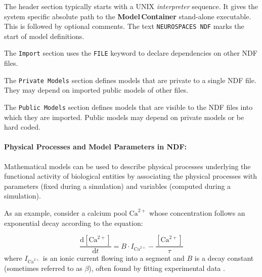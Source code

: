 \documentclass[11pt,3p,twocolumn]{JMN}
\begin{document}
The header section
typically starts with a UNIX {\it interpreter} sequence. It
gives the system specific absolute path to the {\bf Model\,Container} stand-alone executable.
This is followed by optional comments.  The text {\tt NEUROSPACES NDF} marks the start of model definitions.

The {\tt Import} section
 uses the {\tt FILE} keyword to declare
dependencies on other NDF files.


The {\tt Private Models} section defines models that are private to a single NDF file.  They may depend on imported public models of other files.

The {\tt Public Models} section defines models that are visible to the NDF files into
which they are imported.
  Public models may depend on private models or
be hard coded.

\paragraph{Physical Processes and Model Parameters in NDF:} Mathematical models can be used to describe physical processes underlying the functional activity of biological entities by associating the physical processes with parameters (fixed during a simulation) and
variables (computed during a simulation).

As an example, consider a calcium pool $\mathrm{Ca}^{2+}$ whose concentration
follows an exponential decay according to the equation:

\begin{equation}
  \label{eq:decay-concentration}
  \frac{\mathrm{d}[\mathrm{Ca}^{2+}]}{\mathrm{d}t} = B \cdot I_{\mathrm{Ca}^{2+}}
  - \frac{[\mathrm{Ca}^{2+}]}{\tau}
\end{equation}
where $I_{\mathrm{Ca}^{2+}}$ is an ionic current flowing into a segment
and $B$ is a decay constant (sometimes referred to as $\beta$), often
found by fitting experimental data \cite{bower98:_book_genes}.
\end{document}
